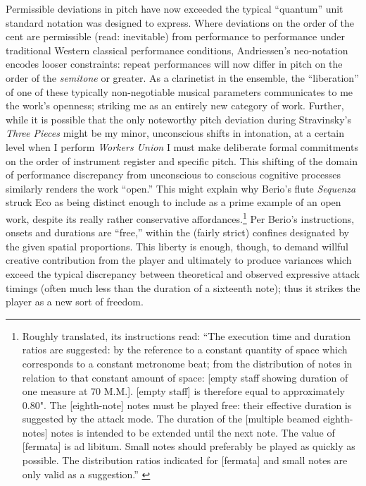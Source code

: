     Permissible deviations in pitch have now exceeded the typical ``quantum'' unit standard notation was designed to express. Where deviations on the order of the cent are permissible (read: inevitable) from performance to performance under traditional Western classical performance conditions, Andriessen's neo-notation encodes looser constraints: repeat performances will now differ in pitch on the order of the \textit{semitone} or greater. As a clarinetist in the ensemble, the ``liberation'' of one of these typically non-negotiable musical parameters communicates to me the work's openness; striking me as an entirely new category of work. Further, while it is possible that the only noteworthy pitch deviation during Stravinsky's \textit{Three Pieces} might be my minor, unconscious shifts in intonation, at a certain level when I perform \textit{Workers Union} I must make deliberate formal commitments on the order of instrument register and specific pitch. This shifting of the domain of performance discrepancy from unconscious to conscious cognitive processes similarly renders the work ``open.'' This might explain why Berio's flute \textit{Sequenza} struck Eco as being distinct enough to include as a prime example of an open work, despite its really rather conservative affordances.\footnote{Roughly translated, its instructions read: ``The execution time and duration ratios are suggested: by the reference to a constant quantity of space which corresponds to a constant metronome beat; from the distribution of notes in relation to that constant amount of space: [empty staff showing duration of one measure at 70 M.M.]. [empty staff] is therefore equal to approximately 0.80". The [eighth-note] notes must be played free: their effective duration is suggested by the attack mode. The duration of the [multiple beamed eighth-notes] notes is intended to be extended until the next note. The value of [fermata] is ad libitum. Small notes should preferably be played as quickly as possible. The distribution ratios indicated for [fermata] and small notes are only valid as a suggestion.'' \autocite{Berio_1958}} Per Berio's instructions, onsets and durations are ``free,'' within the (fairly strict) confines designated by the given spatial proportions. This liberty is enough, though, to demand willful creative contribution from the player and ultimately to produce variances which exceed the typical discrepancy between theoretical and observed expressive attack timings (often much less than the duration of a sixteenth note); thus it strikes the player as a new sort of freedom.\autocite{Benadon_2009}

